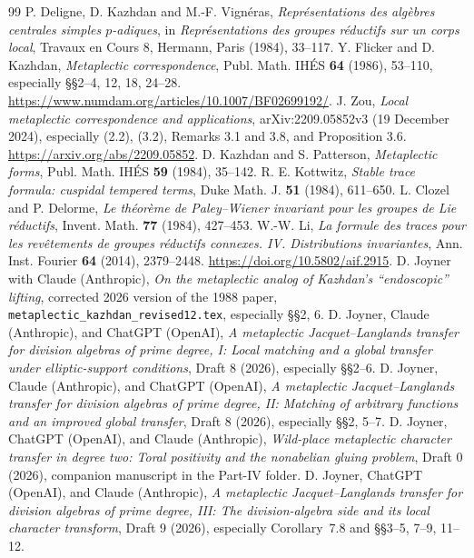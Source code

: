 \documentclass[11pt]{article}
\theoremstyle{plain}
\theoremstyle{definition}
\begin{document}
\begin{thebibliography}{99}
 P. Deligne, D. Kazhdan and M.-F. Vign\'eras,
\emph{Repr\'esentations des alg\`ebres centrales simples $p$-adiques},
in \emph{Repr\'esentations des groupes r\'eductifs sur un corps local},
Travaux en Cours 8, Hermann, Paris (1984), 33--117.
 Y. Flicker and D. Kazhdan,
\emph{Metaplectic correspondence}, Publ. Math. IH\'ES \textbf{64}
(1986), 53--110, especially \S\S2--4, 12, 18, 24--28.
\url{https://www.numdam.org/articles/10.1007/BF02699192/}.
 J. Zou,
\emph{Local metaplectic correspondence and applications},
arXiv:2209.05852v3 (19 December 2024), especially
(2.2), (3.2), Remarks 3.1 and 3.8, and Proposition 3.6.
\url{https://arxiv.org/abs/2209.05852}.
 D. Kazhdan and S. Patterson,
\emph{Metaplectic forms}, Publ. Math. IH\'ES \textbf{59}
(1984), 35--142.
 R. E. Kottwitz,
\emph{Stable trace formula: cuspidal tempered terms}, Duke Math. J.
\textbf{51} (1984), 611--650.
 L. Clozel and P. Delorme,
\emph{Le th\'eor\`eme de Paley--Wiener invariant pour les groupes de Lie
r\'eductifs}, Invent. Math. \textbf{77} (1984), 427--453.
 W.-W. Li,
\emph{La formule des traces pour les rev\^etements de groupes
r\'eductifs connexes. IV. Distributions invariantes},
Ann. Inst. Fourier \textbf{64} (2014), 2379--2448.
\url{https://doi.org/10.5802/aif.2915}.
 D. Joyner with Claude (Anthropic),
\emph{On the metaplectic analog of Kazhdan's ``endoscopic'' lifting},
corrected 2026 version of the 1988 paper,
\texttt{metaplectic\_kazhdan\_revised12.tex}, especially \S\S2, 6.
 D. Joyner, Claude (Anthropic), and ChatGPT (OpenAI),
\emph{A metaplectic Jacquet--Langlands transfer for division algebras
of prime degree, I: Local matching and a global transfer under
elliptic-support conditions}, Draft 8 (2026), especially \S\S2--6.
 D. Joyner, Claude (Anthropic), and ChatGPT (OpenAI),
\emph{A metaplectic Jacquet--Langlands transfer for division algebras
of prime degree, II: Matching of arbitrary functions and an improved
global transfer}, Draft 8 (2026), especially \S\S2, 5--7.
 D. Joyner, ChatGPT (OpenAI), and Claude (Anthropic),
\emph{Wild-place metaplectic character transfer in degree two:
Toral positivity and the nonabelian gluing problem},
Draft 0 (2026), companion manuscript in the Part-IV folder.
 D. Joyner, ChatGPT (OpenAI), and Claude (Anthropic),
\emph{A metaplectic Jacquet--Langlands transfer for division algebras
of prime degree, III: The division-algebra side and its local
character transform}, Draft 9 (2026), especially Corollary~7.8
and \S\S3--5, 7--9, 11--12.
\end{thebibliography}
\end{document}

